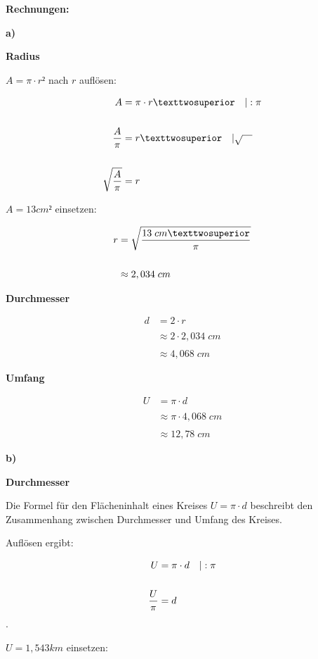 \documentclass[
  ngerman,
]{book}
\begin{document}
\textbf{Rechnungen:}

\textbf{a)}

\textbf{Radius}

\(A = \pi \cdot r²\) nach \(r\) auflösen:

\[\begin{align} A &= \pi \cdot r² \quad |:\pi \\
{}\\
{A \over \pi} &= r² \quad |\sqrt{\quad}\\
{}\\
\sqrt{A \over \pi} &= r
\end{align}\]

\(A=13cm²\) einsetzen:

\[\begin{align}r&= \sqrt{13\;cm² \over \pi} \\
{}\\
&\approx 2,034\;cm\end{align}\]

\textbf{Durchmesser}

\[\begin{align} d&=2 \cdot r \\
{}\\
&\approx 2 \cdot 2,034\;cm \\
{}\\
&\approx 4,068\;cm\end{align}\]

\textbf{Umfang}

\[\begin{align} U &= \pi \cdot d \\
{}\\
&\approx \pi \cdot  4,068\;cm \\
{}\\
&\approx 12,78\;cm\end{align}\]

\textbf{b)}

\textbf{Durchmesser}

Die Formel für den Flächeninhalt eines Kreises \(U= \pi \cdot d\) beschreibt den Zusammenhang zwischen Durchmesser und Umfang des Kreises.

Auflösen ergibt:

\[ \begin{align} U &= \pi \cdot d \quad |: \pi \\
{}\\
{U \over \pi} &= d 
\end{align}\].

\(U=1,543 km\) einsetzen:
\end{document}
